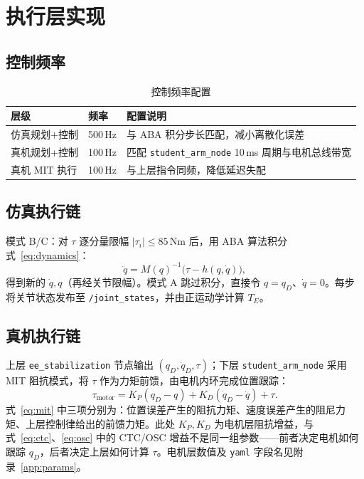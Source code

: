 \documentclass[UTF8, a4paper, 12pt]{ctexart}
\begin{document}
\section{执行层实现}

\subsection{控制频率}

\begin{table}[H]
  \centering
  \caption{控制频率配置}
  \label{tab:freq}
  \begin{tabular}{@{} l l l @{}}
    \toprule
    层级 & 频率 & 配置说明 \\
    \midrule
    仿真规划+控制 & 500\,Hz & 与 ABA 积分步长匹配，减小离散化误差 \\
    真机规划+控制 & 100\,Hz & 匹配 \texttt{student\_arm\_node} 10\,ms 周期与电机总线带宽 \\
    真机 MIT 执行 & 100\,Hz & 与上层指令同频，降低延迟失配 \\
    \bottomrule
  \end{tabular}
\end{table}

\subsection{仿真执行链}

模式 B/C：对 $\tau$ 逐分量限幅 $|\tau_i|\le 85$\,Nm 后，用 ABA 算法积分式~\eqref{eq:dynamics}：
\begin{equation}
    \ddot{q}=M(q)^{-1}\bigl(\tau-h(q,\dot{q})\bigr),
\end{equation}
得到新的 $\dot{q},q$（再经关节限幅）。模式 A 跳过积分，直接令 $q=q_D$、$\dot{q}=0$。每步将关节状态发布至 \texttt{/joint\_states}，并由正运动学计算 $T_E$。

\subsection{真机执行链}

上层 \texttt{ee\_stabilization} 节点输出 $(q_D,\dot{q}_D,\tau)$；下层 \texttt{student\_arm\_node} 采用 MIT 阻抗模式，将 $\tau$ 作为力矩前馈，由电机内环完成位置跟踪：
\begin{equation}
    \tau_{\mathrm{motor}} = K_P(q_D - q) + K_D(\dot{q}_D - \dot{q}) + \tau.
    \label{eq:mit}
\end{equation}
式~\eqref{eq:mit} 中三项分别为：位置误差产生的阻抗力矩、速度误差产生的阻尼力矩、上层控制律给出的前馈力矩。此处 $K_P,K_D$ 为电机层阻抗增益，与式~\eqref{eq:ctc}、\eqref{eq:osc} 中的 CTC/OSC 增益不是同一组参数——前者决定电机如何跟踪 $q_D$，后者决定上层如何计算 $\tau$。电机层数值及 \texttt{yaml} 字段名见附录~\ref{app:params}。
\end{document}
